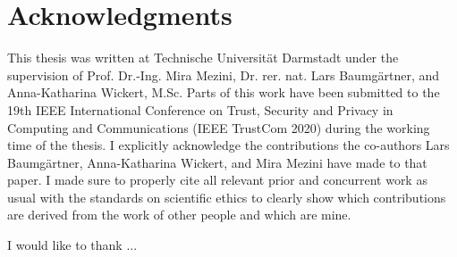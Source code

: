 \chapter*{Acknowledgments}

This thesis was written at Technische Universität Darmstadt under the supervision of Prof. Dr.-Ing. Mira Mezini,
Dr. rer. nat. Lars Baumgärtner, and Anna-Katharina Wickert, M.Sc.
Parts of this work have been submitted to the 19th IEEE International Conference on Trust, Security and Privacy in
Computing and Communications (IEEE TrustCom 2020)  during the working time of the
thesis.
I explicitly acknowledge the contributions the co-authors Lars Baumgärtner, Anna-Katharina Wickert, and Mira Mezini
have made to that paper.
I made sure to properly cite all relevant prior and concurrent work as usual with the standards on scientific ethics
to clearly show which contributions are derived from the work of other people and which are mine.

I would like to thank ...
